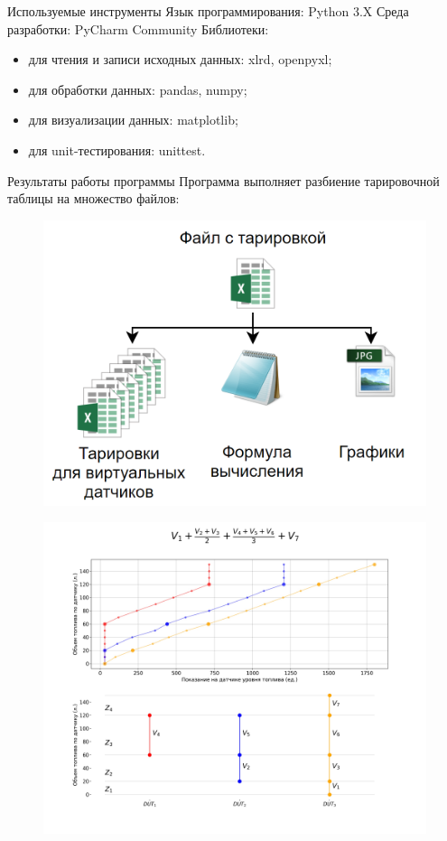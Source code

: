 \documentclass[usenames,dvipsnames,11pt]{beamer}
\begin{document}
\begin{frame}{Используемые инструменты}
	Язык программирования: Python 3.X
	\bigbreak
	Среда разработки: PyCharm Community
	\bigbreak
	Библиотеки:
	\begin{itemize}
		\item для чтения и записи исходных данных: xlrd, openpyxl;
		\item для обработки данных: pandas, numpy;
		\item для визуализации данных: matplotlib;
		\item для unit-тестирования: unittest.
	\end{itemize}
\end{frame}	

\begin{frame}{Результаты работы программы}
	Программа выполняет разбиение тарировочной таблицы на множество файлов:
	\begin{figure}
		\centering
		\includegraphics[width=0.7\linewidth]{graphics/screenshot010}
	\end{figure}
\end{frame}

\begin{frame}
	\begin{figure}
	\centering
	\includegraphics[width=0.95\linewidth]{../Программа/test/test_main/tmp2/plot}
	\end{figure}
\end{frame}
\end{document}
